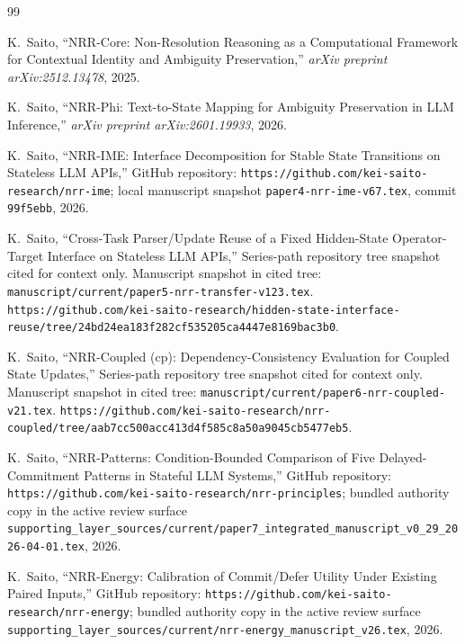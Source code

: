 \documentclass[11pt]{article}
\begin{document}
\begin{thebibliography}{99}
\raggedright

K.~Saito,
\newblock ``NRR-Core: Non-Resolution Reasoning as a Computational Framework for Contextual Identity and Ambiguity Preservation,''
\newblock \emph{arXiv preprint arXiv:2512.13478}, 2025.

K.~Saito,
\newblock ``NRR-Phi: Text-to-State Mapping for Ambiguity Preservation in LLM Inference,''
\newblock \emph{arXiv preprint arXiv:2601.19933}, 2026.

K.~Saito,
\newblock ``NRR-IME: Interface Decomposition for Stable State Transitions on Stateless LLM APIs,''
\newblock GitHub repository: \texttt{https://github.com/kei-saito-research/nrr-ime}; local manuscript snapshot \texttt{paper4-nrr-ime-v67.tex}, commit \texttt{99f5ebb}, 2026.

K.~Saito,
\newblock ``Cross-Task Parser/Update Reuse of a Fixed Hidden-State Operator-Target Interface on Stateless LLM APIs,''
\newblock Series-path repository tree snapshot cited for context only. Manuscript snapshot in cited tree:
\texttt{manuscript/current/paper5-nrr-transfer-v123.tex}. \texttt{https://github.com/kei-saito-research/hidden-state-interface-reuse/tree/24bd24ea183f282cf535205ca4447e8169bac3b0}.

K.~Saito,
\newblock ``NRR-Coupled (cp): Dependency-Consistency Evaluation for Coupled State Updates,''
\newblock Series-path repository tree snapshot cited for context only. Manuscript snapshot in cited tree:
\texttt{manuscript/current/paper6-nrr-coupled-v21.tex}.
\texttt{https://github.com/kei-saito-research/nrr-coupled/tree/aab7cc500acc413d4f585c8a50a9045cb5477eb5}.

K.~Saito,
\newblock ``NRR-Patterns: Condition-Bounded Comparison of Five Delayed-Commitment Patterns in Stateful LLM Systems,''
\newblock GitHub repository: \texttt{https://github.com/kei-saito-research/nrr-principles}; bundled authority copy in the active review surface \texttt{supporting\_layer\_sources/current/paper7\_integrated\_manuscript\_v0\_29\_2026-04-01.tex}, 2026.

K.~Saito,
\newblock ``NRR-Energy: Calibration of Commit/Defer Utility Under Existing Paired Inputs,''
\newblock GitHub repository: \texttt{https://github.com/kei-saito-research/nrr-energy}; bundled authority copy in the active review surface \texttt{supporting\_layer\_sources/current/nrr-energy\_manuscript\_v26.tex}, 2026.


\end{thebibliography}
\end{document}
